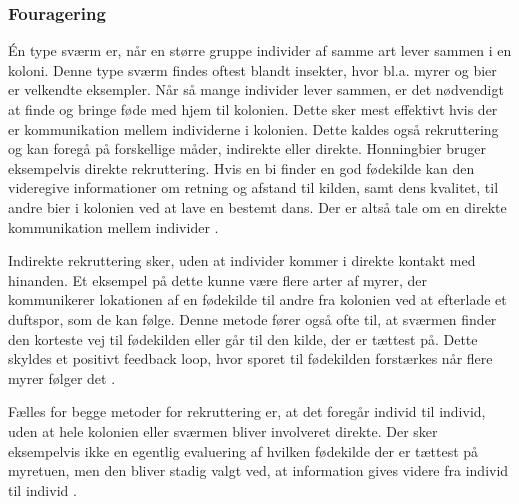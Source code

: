 \subsubsection{Fouragering}
Én type sværm er, når en større gruppe individer af samme art lever sammen i en koloni. Denne type sværm findes oftest blandt insekter, hvor bl.a. myrer og bier er velkendte eksempler. Når så mange individer lever sammen, er det nødvendigt at finde og bringe føde med hjem til kolonien. Dette sker mest effektivt hvis der er kommunikation mellem individerne i kolonien. Dette kaldes også rekruttering og kan foregå på forskellige måder, indirekte eller direkte. Honningbier bruger eksempelvis direkte rekruttering. Hvis en bi finder en god fødekilde kan den videregive informationer om retning og afstand til kilden, samt dens kvalitet, til andre bier i kolonien ved at lave en bestemt dans. Der er altså tale om en direkte kommunikation mellem individer \cite{beekman2008biological}. 
\par 
Indirekte rekruttering sker, uden at individer kommer i direkte kontakt med hinanden. Et eksempel på dette kunne være flere arter af myrer, der kommunikerer lokationen af en fødekilde til andre fra kolonien ved at efterlade et duftspor, som de kan følge. Denne metode fører også ofte til, at sværmen finder den korteste vej til fødekilden eller går til den kilde, der er tættest på. Dette skyldes et positivt feedback loop, hvor sporet til fødekilden forstærkes når flere myrer følger det \cite{beekman2008biological}. 
\par
Fælles for begge metoder for rekruttering er, at det foregår individ til individ, uden at hele kolonien eller sværmen bliver involveret direkte. Der sker eksempelvis ikke en egentlig evaluering af hvilken fødekilde der er tættest på myretuen, men den bliver stadig valgt ved, at information gives videre fra individ til individ \cite{beekman2008biological}. 

